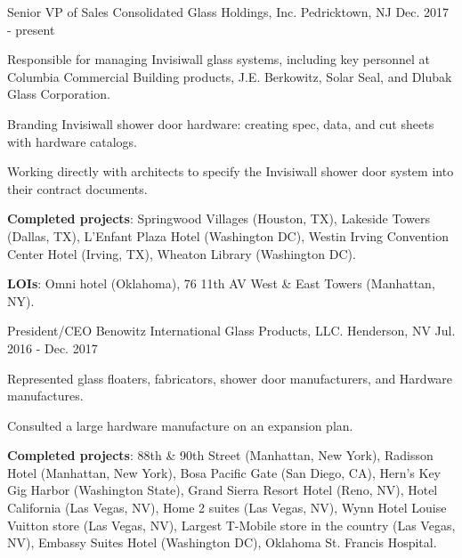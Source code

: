 


\begin{cventries}

\cventry
{Senior VP of Sales} %
{Consolidated Glass Holdings, Inc.} %
{Pedricktown, NJ} %
{Dec. 2017 - present} %
{ %
\begin{cvitems}
\item{Responsible for managing Invisiwall glass systems, including key personnel at Columbia Commercial Building products, J.E. Berkowitz, Solar Seal, and Dlubak Glass Corporation. }
\item{Branding Invisiwall shower door hardware: creating spec, data, and cut sheets with hardware catalogs.}
\item{Working directly with architects to specify the Invisiwall shower door system into their contract documents.}
\item{\textbf{Completed projects}}: Springwood Villages (Houston, TX), Lakeside Towers (Dallas, TX), L'Enfant Plaza Hotel (Washington DC), Westin Irving Convention Center Hotel (Irving, TX), Wheaton Library (Washington DC).
\item{\textbf{LOIs}}: Omni hotel (Oklahoma), 76 11th AV West \& East Towers (Manhattan, NY).
\end{cvitems}
}

\cventry
{President/CEO} %
{Benowitz International Glass Products, LLC. } %
{Henderson, NV} %
{Jul. 2016 - Dec. 2017} %
{ %
\begin{cvitems}
\item{Represented glass floaters, fabricators, shower door manufacturers, and Hardware manufactures.}
\item{Consulted a large hardware manufacture on an expansion plan.}
\item{\textbf{Completed projects}: 88th \& 90th Street (Manhattan, New York), Radisson Hotel (Manhattan, New York), Bosa Pacific Gate (San Diego, CA), Hern's Key Gig Harbor (Washington State), Grand Sierra Resort Hotel (Reno, NV), Hotel California (Las Vegas, NV), Home 2 suites (Las Vegas, NV), Wynn Hotel Louise Vuitton store (Las Vegas, NV), Largest T-Mobile store in the country (Las Vegas, NV), Embassy Suites Hotel (Washington DC), Oklahoma St. Francis Hospital.}
\end{cvitems}
}


\end{cventries}
